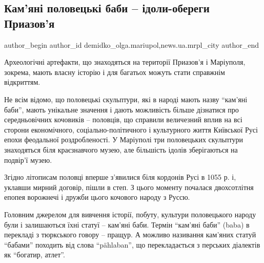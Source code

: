 
 
 
 
 
 
\subsection{Кам'яні половецькі баби – ідоли-обереги Приазов'я}
\label{sec:22_09_2017.stz.news.ua.mrpl_city.1.kamjani_polovecki_baby_idoly_oberegy_priazovja}
 
\ifcmt
 author_begin
   author_id demidko_olga.mariupol,news.ua.mrpl_city
 author_end
\fi

Археологічні артефакти, що знаходяться на території Приазов'я і Маріуполя,
зокрема, мають власну історію і для багатьох можуть стати справжнім
відкриттям.


Не всім відомо, що половецькі скульптури, які в народі мають назву \enquote{кам'яні
баби}, мають унікальне значення і дають можливість більше дізнатися про
середньовічних кочовиків – половців, що справили величезний вплив на всі
сторони економічного, соціально-політичного і культурного життя Київської Русі
епохи феодальної роздробленості. У Маріуполі три  половецьких скульптури
знаходяться біля краєзнавчого музею, але більшість ідолів зберігаються на
подвір'ї музею.

Згідно літописам половці вперше з'явилися біля кордонів Русі в 1055 р. і,
уклавши мирний договір, пішли в степ. З цього моменту почалася двохсотлітня
епопея ворожнечі і дружби цього кочового народу з Руссю.

Головним джерелом для вивчення історії, побуту, культури половецького народу
були і залишаються їхні статуї – кам'яні баби. Термін \enquote{кам'яні баби} (baba) в
перекладі з тюркського говору – пращур. А можливо називання кам'яних статуй
\enquote{бабами} походить від слова \enquote{pählaban}, що перекладається з перських діалектів
як \enquote{богатир, атлет}.

